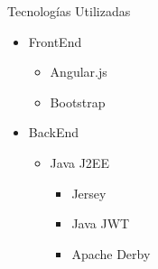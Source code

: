 \documentclass{beamer}
\begin{document}
            \begin{frame}{Tecnologías Utilizadas}
                \begin{itemize}
                    \item FrontEnd
                    \begin{itemize}
                        \item Angular.js
                        \item Bootstrap
                    \end{itemize}

                    \item BackEnd
                    \begin{itemize}
                        \item Java J2EE
                        \begin{itemize}
                            \item Jersey
                            \item Java JWT
                            \item Apache Derby
                        \end{itemize}
                    \end{itemize}
                \end{itemize}


\end{frame}
\end{document}
